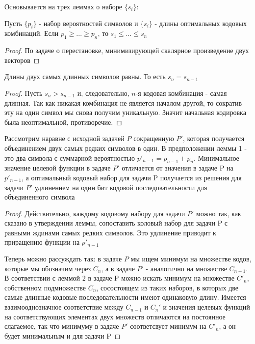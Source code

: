 \documentclass[discrete.tex]{subfiles}
\begin{document}
  \begin{sol}
    Основывается на трех леммах о наборе $\{s_i\}$:
    \begin{lemma}[1]
      Пусть $\{p_i\}$ - набор вероятностей символов и $\{s_i\}$ - длины оптимальных кодовых комбинаций. Если $p_1 \geq ... \geq p_n$, то $s_1 \leq ... \leq s_n$
    \end{lemma}

    \begin{proof}
      По задаче о перестановке, минимизирующей скалярное произведение двух векторов
    \end{proof}

    \begin{lemma}[2]
      Длины двух самых длинных символов равны. То есть $s_n = s_{n-1}$
    \end{lemma}

    \begin{proof}
      Пусть $s_n > s_{n-1}$ и, следовательно, $n$-я кодовая комбинация - самая длинная. Так как никакая комбинация не является началом другой, то сократив эту на один символ мы снова получим уникальную. Значит начальная кодировка была неоптимальной, противоречие.
    \end{proof}

    \begin{lemma}[3]
      Рассмотрим наравне с исходной задачей $P$ сокращенную $P'$,  которая получается объединением двух самых редких символов в один. В предположении леммы 1 - это два символа с суммарной вероятностью $p'_{n-1} = p_{n-1} + p_n$. Минимальное значение целевой функции в задаче $P'$ отличается от значения в задаче P на $p'_{n-1}$, а оптимальный кодовый набор для задачи P получается из решения для задачи $P'$ удлинением на один бит кодовой последовательности для объединенного символа
    \end{lemma}

    \begin{proof}
      Действительно, каждому кодовому набору для задачи $P'$ можно так, как сказано в утверждении леммы, сопоставить коловый набор для задачи P с равными ждинами самых редких символов. Это удлинение приводит к приращению функции на $p'_{n-1}$

      Теперь можно рассуждать так: в задаче $P$ мы ищем минимум на множестве кодов, которые мы обозначим через $C_n$, а в задаче $P'$ - аналогично на множестве $C_{n-1}$. В соответствии с леммой 2 в задаче P можно искать минимум на множестве $C'_n$, собственном подмножестве $C_n$, сосостоящем из таких наборов, в которых две самые длинные кодовые последовательности имеют одинаковую длину. Имеется взаимооднозначное соответствие между $C_{n-1}$ и $C_n'$ и значения целевых функций на соответствующих элементах двух множеств отличаются на постоянное слагаемое, так что минимуму в задаче $P'$ соответсвует минимум на $C'_n$, а он будет минимальным и для задачи P
    \end{proof}


\end{sol}
\end{document}
